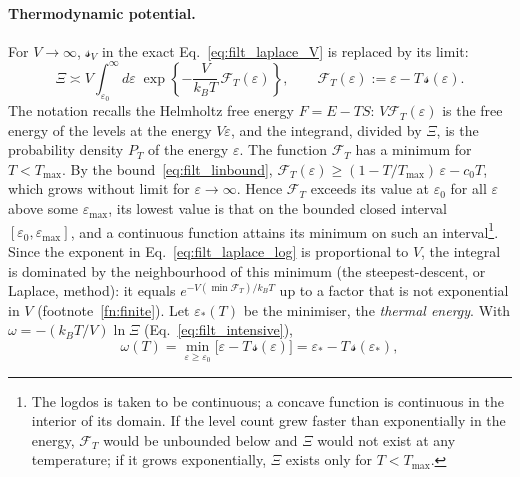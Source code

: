 \documentclass[10pt,a4paper]{article}
\theoremstyle{plain}
\newcommand{\lndos}{{logdos}}  %
\newcommand{\Fen}[1][T]{\mathscr{F}_{#1}}  %
\newcommand{\lds}{\mathscr{s}}  %
\newcommand{\Tmax}{T_{\max}}  %
\begin{document}
\paragraph{Thermodynamic potential.} For $V\to\infty$, $\lds_V$ in the exact
Eq.~\eqref{eq:filt_laplace_V} is replaced by its limit:
\begin{equation}\label{eq:filt_laplace_log}
  \Xi\asymp V\int_{\varepsilon_0}^{\infty}d\varepsilon\;
  \exp\left\{-\frac{V}{k_BT}\,\Fen(\varepsilon)\right\} ,
  \qquad \Fen(\varepsilon):=\varepsilon-T\,\lds(\varepsilon) .
\end{equation}
The notation recalls the Helmholtz free energy $F=E-TS$: $V\Fen(\varepsilon)$
is the free energy of the levels at the energy $V\varepsilon$, and the
integrand, divided by $\Xi$, is the probability density $P_T$ of the energy $\varepsilon$.
The function $\Fen$ has a minimum for $T<\Tmax$. By the
bound~\eqref{eq:filt_linbound},
$\Fen(\varepsilon)\ge(1-T/\Tmax)\,\varepsilon-c_0T$, which grows without
limit for $\varepsilon\to\infty$. Hence $\Fen$ exceeds its value at
$\varepsilon_0$ for all $\varepsilon$ above some $\varepsilon_{\max}$, its
lowest value is that on the bounded closed interval
$[\varepsilon_0,\varepsilon_{\max}]$, and a continuous function attains its
minimum on such an interval\footnote{The \lndos{} is taken to be continuous;
a concave function is continuous in the interior of its domain. If the level
count grew faster than exponentially in the energy, $\Fen$ would be unbounded
below and $\Xi$ would not exist at any temperature; if it grows
exponentially, $\Xi$ exists only for $T<\Tmax$.}. Since the exponent in
Eq.~\eqref{eq:filt_laplace_log} is proportional to $V$, the integral is
dominated by the neighbourhood of this minimum (the steepest-descent, or
Laplace, method): it equals $e^{-V(\min\Fen)/k_BT}$ up to a factor that is
not exponential in $V$ (footnote~\ref{fn:finite}). Let $\varepsilon_*(T)$ be
the minimiser, the \emph{thermal energy}. With $\omega=-(k_BT/V)\ln\Xi$
(Eq.~\eqref{eq:filt_intensive}),
\begin{equation}\label{eq:filt_legendre}
  \omega(T) = \min_{\varepsilon\ge\varepsilon_0}\big[\varepsilon - T\,\lds(\varepsilon)\big]
  = \varepsilon_* - T\,\lds(\varepsilon_*) ,
\end{equation}
\end{document}
